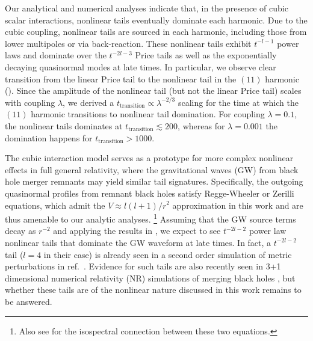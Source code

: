 Our analytical and numerical analyses indicate that, in the presence of cubic scalar interactions, nonlinear tails eventually dominate each harmonic.
Due to the cubic coupling, nonlinear tails are sourced in each harmonic, including those from lower multipoles or via back-reaction.
These nonlinear tails exhibit $t^{-l-1}$ power laws and dominate over the $t^{-2l-3}$ Price tails as well as the exponentially decaying quasinormal modes at late times.
In particular, we observe clear transition from the linear Price tail to the nonlinear tail in the $(11)$ harmonic ().
Since the amplitude of the nonlinear tail (but not the linear Price tail) scales with coupling $\lambda$, we derived a $t_{\mathrm{transition}} \propto \lambda^{-2/3}$ scaling for the time at which the $(11)$ harmonic transitions to nonlinear tail domination.
For coupling $\lambda = 0.1$, the nonlinear tails dominates at $t_{\mathrm{transition}} \lesssim 200$, whereas for $\lambda = 0.001$ the domination happens for $t_{\mathrm{transition}} > 1000$.


The cubic interaction model serves as a prototype for more complex nonlinear effects in full general relativity, where the gravitational waves (GW) from black hole merger remnants may yield similar tail signatures.
Specifically, the outgoing quasinormal profiles from remnant black holes satisfy Regge-Wheeler or Zerilli equations, which admit the $V \approx l(l+1)/r^2$ approximation in this work and are thus amenable to our analytic analyses.
\footnote{Also see  for the isospectral connection between these two equations.}
Assuming that the GW source terms decay as $r^{-2}$ and applying the results in , we expect to see $t^{-2l-2}$ power law nonlinear tails that dominate the GW waveform at late times.
In fact, a $t^{-2l-2}$ tail ($l=4$ in their case) is already seen in a second order simulation of metric perturbations in ref.~\cite{Cardoso:2024jme}.
Evidence for such tails are also recently seen in 3+1 dimensional numerical relativity (NR) simulations of merging black holes \cite{DeAmicis:2024eoy,Ma:2024hzq}, but whether these tails are of the nonlinear nature discussed in this work remains to be answered.




